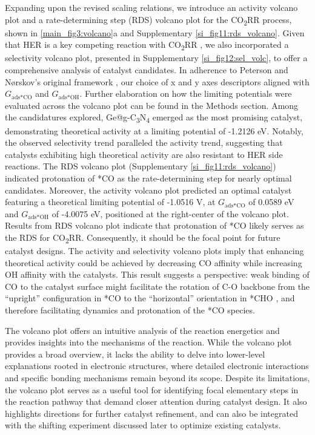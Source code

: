 Expanding upon the revised scaling relations, we introduce an activity volcano plot and a rate-determining step (RDS) volcano plot for the CO\textsubscript{2}RR process, shown in \cref{main_fig3:volcano}a and Supplementary \cref{si_fig11:rds_volcano}.
Given that HER is a key competing reaction with CO\textsubscript{2}RR \cite{goyal2020competition}, we also incorporated a selectivity volcano plot, presented in Supplementary \cref{si_fig12:sel_volc}, to offer a comprehensive analysis of catalyst candidates.
In adherence to Peterson and Nørskov's original framework \cite{peterson2012activity}, our choice of x and y axes descriptors aligned with $\textit{G}_{\text{ads} \ast \text{CO}}$ and $\textit{G}_{\text{ads} \ast \text{OH}}$.
Further elaboration on how the limiting potentials were evaluated across the volcano plot can be found in the Methods section.
Among the candidatures explored, Ge@g-C\textsubscript{3}N\textsubscript{4} emerged as the most promising catalyst, demonstrating theoretical activity at a limiting potential of -1.2126 eV.
Notably, the observed selectivity trend paralleled the activity trend, suggesting that catalysts exhibiting high theoretical activity are also resistant to HER side reactions.
The RDS volcano plot (Supplementary \cref{si_fig11:rds_volcano}) indicated protonation of *CO as the rate-determining step for nearly optimal candidates.
Moreover, the activity volcano plot predicted an optimal catalyst featuring a theoretical limiting potential of -1.0516 V, at $\textit{G}_{\text{ads} \ast \text{CO}}$ of 0.0589 eV and $\textit{G}_{\text{ads} \ast \text{OH}}$ of -4.0075 eV, positioned at the right-center of the volcano plot.
Results from RDS volcano plot indicate that protonation of *CO likely serves as the RDS for CO\textsubscript{2}RR.
Consequently, it should be the focal point for future catalyst designs.
The activity and selectivity volcano plots imply that enhancing theoretical activity could be achieved by decreasing CO affinity while increasing OH affinity with the catalysts.
This result suggests a perspective: weak binding of CO to the catalyst surface might facilitate the rotation of C-O backbone from the “upright” configuration in *CO to the “horizontal” orientation in *CHO \cite{peterson2010copper},
and therefore facilitating dynamics and protonation of the *CO species.

The volcano plot offers an intuitive analysis of the reaction energetics and provides insights into the mechanisms of the reaction.
While the volcano plot provides a broad overview, it lacks the ability to delve into lower-level explanations rooted in electronic structures, where detailed electronic interactions and specific bonding mechanisms remain beyond its scope.
Despite its limitations, the volcano plot serves as a useful tool for identifying focal elementary steps in the reaction pathway that demand closer attention during catalyst design.
It also highlights directions for further catalyst refinement, and can also be integrated with the shifting experiment discussed later to optimize existing catalysts.

